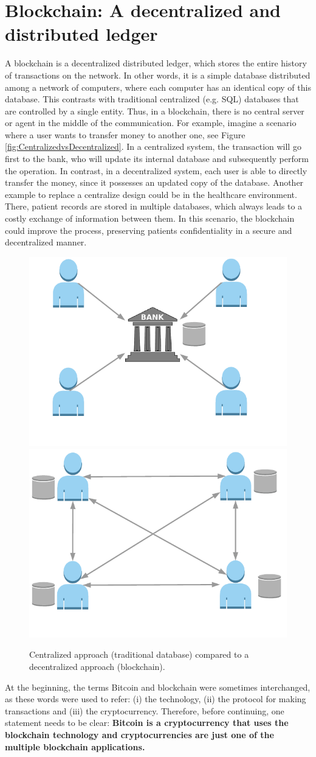 \section{Blockchain: A decentralized and distributed ledger}

A blockchain is a decentralized distributed ledger, which stores the entire history of transactions on the network. In other words, it is a simple database distributed among a network of computers, where each computer has an identical copy of this database. This contrasts with traditional centralized (e.g. SQL) databases that are controlled by a single entity. Thus, in a blockchain, there is no central server or agent in the middle of the communication. For example, imagine a scenario where a user wants to transfer money to another one, see Figure \ref{fig:CentralizedvsDecentralized}. In a centralized system, the transaction will go first to the bank, who will update its internal database and subsequently perform the operation. In contrast, in a decentralized system, each user is able to directly transfer the money, since it possesses an updated copy of the database. Another example to replace a centralize design could be in the healthcare environment. There, patient records are stored in multiple databases, which always leads to a costly exchange of information between them. In this scenario, the blockchain could improve the process, preserving patients confidentiality in a secure and decentralized manner.

\begin{figure}[bth]
	\myfloatalign
	{\includegraphics[width=0.4\linewidth]{gfx/cenVsDec}} \quad
	{\includegraphics[width=0.4\linewidth]{gfx/cenVsDec2}} \\
	\caption{Centralized approach (traditional database) compared to a decentralized approach (blockchain).}
	\label{fig:CentralizedvsDecentralizedx}
\end{figure}
At the beginning, the terms Bitcoin and blockchain were sometimes interchanged, as these words were used to refer: (i) the technology, (ii) the protocol for making transactions and (iii) the cryptocurrency. Therefore, before continuing, one statement needs to be clear: \textbf{Bitcoin is a cryptocurrency that uses the blockchain technology and cryptocurrencies are just one of the multiple blockchain applications.} 

